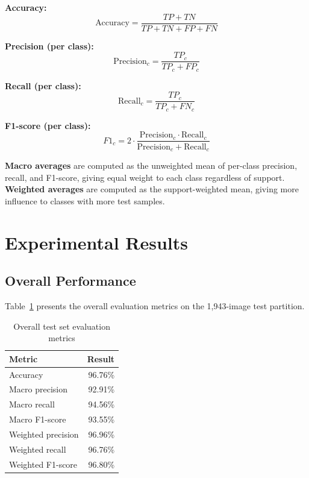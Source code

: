 \documentclass[conference]{IEEEtran}
\begin{document}
\textbf{Accuracy:}
\begin{equation}
\text{Accuracy} = \frac{TP + TN}{TP + TN + FP + FN}
\end{equation}

\textbf{Precision (per class):}
\begin{equation}
\text{Precision}_c = \frac{TP_c}{TP_c + FP_c}
\end{equation}

\textbf{Recall (per class):}
\begin{equation}
\text{Recall}_c = \frac{TP_c}{TP_c + FN_c}
\end{equation}

\textbf{F1-score (per class):}
\begin{equation}
F1_c = 2 \cdot \frac{\text{Precision}_c \cdot \text{Recall}_c}{\text{Precision}_c + \text{Recall}_c}
\end{equation}

\textbf{Macro averages} are computed as the unweighted mean of per-class precision, recall, and F1-score, giving equal weight to each class regardless of support. \textbf{Weighted averages} are computed as the support-weighted mean, giving more influence to classes with more test samples.

\section{Experimental Results}
\label{sec:results}

\subsection{Overall Performance}

Table~\ref{tab:overall} presents the overall evaluation metrics on the 1{,}943-image test partition.

\begin{table}[htbp]
\caption{Overall test set evaluation metrics}
\label{tab:overall}
\centering
\begin{tabular}{l|r}
\toprule
\textbf{Metric} & \textbf{Result} \\
\midrule
Accuracy              & 96.76\% \\
Macro precision       & 92.91\% \\
Macro recall          & 94.56\% \\
Macro F1-score        & 93.55\% \\
Weighted precision    & 96.96\% \\
Weighted recall       & 96.76\% \\
Weighted F1-score     & 96.80\% \\
\bottomrule
\end{tabular}
\end{table}
\end{document}

